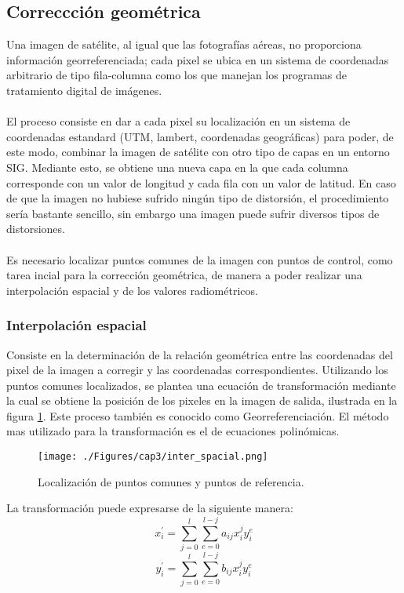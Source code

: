 \subsection{Correccci\'on geom\'etrica}\label{sec:corrGeometrica}
Una imagen de sat\'elite, al igual que las fotograf\'ias a\'ereas, no proporciona informaci\'on georreferenciada; cada pixel se ubica en un sistema de coordenadas arbitrario de tipo fila-columna como los que manejan los programas de tratamiento digital de im\'agenes.\\~\\
El proceso consiste en dar a cada pixel su localizaci\'on en un sistema de coordenadas estandard (UTM, lambert, coordenadas geogr\'aficas) para poder, de este modo, combinar la imagen de sat\'elite con otro tipo de capas en un entorno SIG. Mediante esto, se obtiene una nueva capa en la que cada columna corresponde con un valor de longitud y cada fila con un valor de latitud. En caso de que la imagen no hubiese sufrido ningún tipo de distorsi\'on, el procedimiento ser\'ia bastante sencillo, sin embargo una imagen puede sufrir diversos tipos de distorsiones.\\~\\
Es necesario localizar puntos comunes de la imagen con puntos de control, como tarea incial para la correcci\'on geom\'etrica, de manera a poder realizar una interpolaci\'on espacial y de los valores radiom\'etricos\cite{deniseCultivos}.

\subsubsection{Interpolaci\'on espacial}
Consiste en la determinaci\'on de la relaci\'on geom\'etrica entre las coordenadas del pixel de la imagen a corregir y las coordenadas correspondientes. Utilizando los puntos comunes localizados, se plantea una ecuaci\'on de transformaci\'on mediante la cual se obtiene la posici\'on de los pixeles en la imagen de salida, ilustrada en la figura \ref{fig:intEspacial}. Este proceso tambi\'en es conocido como Georreferenciaci\'on. El m\'etodo mas utilizado para la transformaci\'on es el de ecuaciones polin\'omicas. 
    \begin{figure}[H]
    	\centering
    	\texttt{[image: ./Figures/cap3/inter\_spacial.png]}
    	\caption{Localizaci\'on de puntos comunes y puntos de referencia.}
    	\label{fig:intEspacial}
    \end{figure}
 
 La transformaci\'on puede expresarse de la siguiente manera:
	\begin{equation}
	x^{'}_{i} = \sum_{j=0}^{l} \sum_{e=0}^{l-j} a_{ij}x^{j}_{i}y^{e}_{i}
	\end{equation} 
		\begin{equation}
		y^{'}_{i} = \sum_{j=0}^{l} \sum_{e=0}^{l-j} b_{ij}x^{j}_{i}y^{e}_{i}
		\end{equation} 


